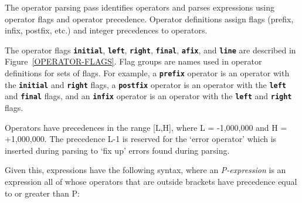 \documentclass[12pt]{article}
\newcommand{\TT}[1]{{\tt \bfseries #1}}
\begin{document}
The operator parsing pass identifies operators
and parses expressions using operator flags 
and operator precedence.
Operator definitions assign flags (prefix, infix, postfix, etc.)
and integer precedences to operators.

The operator flags \TT{initial}, \TT{left}, \TT{right}, \TT{final},
\TT{afix}, and \TT{line} are described in Figure~\ref{OPERATOR-FLAGS}.
Flag groups are names used in operator definitions for sets of flags.
For example, a \TT{prefix} operator is an operator with the
\TT{initial} and \TT{right} flags, a \TT{postfix} operator
is an operator with the \TT{left} and \TT{final} flags, and an
\TT{infix} operator is an operator with the \TT{left} and \TT{right}
flags.

Operators have precedences in the range [L,H],
where L = -1,000,000 and H = +1,000,000.
The precedence L-1 is reserved for the `error operator' which is
inserted during parsing to `fix up' errors found during parsing.

Given this, expressions have the following syntax,
where an {\em P-expression}
is an expression all of whose operators that are outside brackets
have precedence equal to or greater than P:
\end{document}
